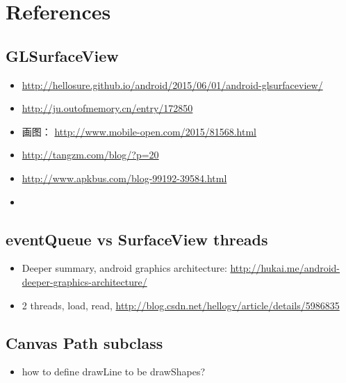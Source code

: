 \documentclass[9pt,b5paper]{article}
\begin{document}
\section{References}
\label{sec-3}
\subsection{GLSurfaceView}
\label{sec-3-1}
\begin{itemize}
\item \url{http://hellosure.github.io/android/2015/06/01/android-glsurfaceview/}
\item \url{http://ju.outofmemory.cn/entry/172850}
\item 画图： \url{http://www.mobile-open.com/2015/81568.html}
\item \url{http://tangzm.com/blog/?p=20}
\item \url{http://www.apkbus.com/blog-99192-39584.html}
\item 
\end{itemize}

\subsection{eventQueue vs SurfaceView threads}
\label{sec-3-2}
\begin{itemize}
\item Deeper summary, android graphics architecture: \url{http://hukai.me/android-deeper-graphics-architecture/}
\item 2 threads, load, read, \url{http://blog.csdn.net/hellogv/article/details/5986835}
\end{itemize}
\subsection{Canvas Path subclass}
\label{sec-3-3}
\begin{itemize}
\item how to define drawLine to be drawShapes?
\end{itemize}
\end{document}
